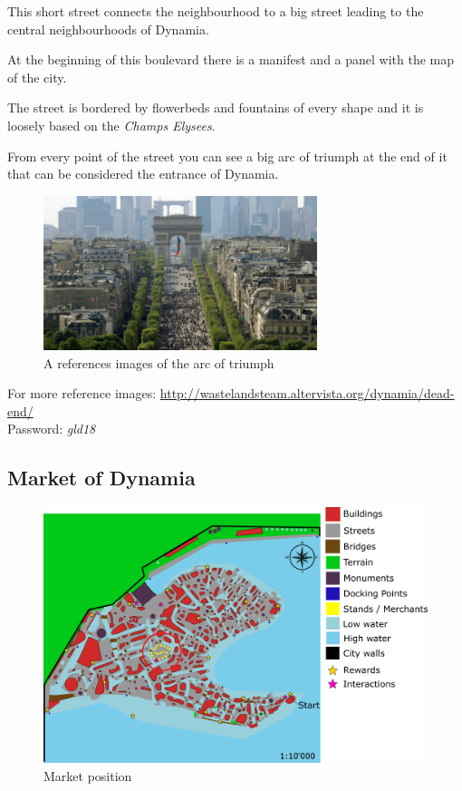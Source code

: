 This short street connects the neighbourhood to a big street leading to the central neighbourhoods of Dynamia.

At the beginning of this boulevard there is a manifest and a panel with the map of the city.

The street is bordered by flowerbeds and fountains of every shape and it is loosely based on the \textit{Champs Elysees}.

From every point of the street you can see a big arc of triumph at the end of it that can be considered the entrance of Dynamia.

\begin{figure}[H]
  \centering
  \includegraphics[width=8cm]{Images/Landmarks/arcOfTriumph}
  \caption{A references images of the arc of triumph}
\end{figure}

For more reference images: \url{http://wastelandsteam.altervista.org/dynamia/dead-end/}\\
Password: \textit{gld18}

\subsection{Market of Dynamia}
\begin{figure}[H]
  \centering
  \includegraphics[width=12cm]{Images/Maps/dynamia_market}
  \caption{Market position}
\end{figure}

